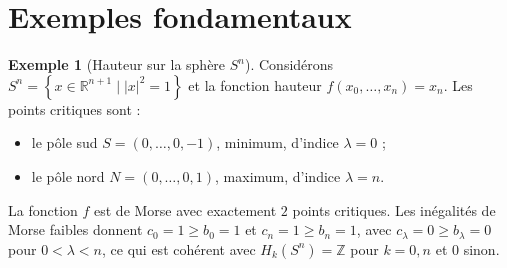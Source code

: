 \documentclass[12pt,a4paper,openany]{book}
\theoremstyle{definition}
\newtheorem{exemple}[definition]{Exemple}
\theoremstyle{plain}
\theoremstyle{remark}
\newcommand{\Z}{\mathbb{Z}}
\newcommand{\R}{\mathbb{R}}
\newcommand{\abs}[1]{\left|#1\right|}
\newcommand{\set}[1]{\left\{#1\right\}}
\begin{document}
\section{Exemples fondamentaux}\label{sec:morse-exemples}

\begin{exemple}[Hauteur sur la sphère $S^n$]\label{ex:morse-sphere}
Considérons $S^n = \set{x \in \R^{n+1} \mid \abs{x}^2 = 1}$ et la fonction
hauteur $f(x_0, \ldots, x_n) = x_n$. Les points critiques sont :
\begin{itemize}
  \item le pôle sud $S = (0, \ldots, 0, -1)$, minimum, d'indice $\lambda = 0$ ;
  \item le pôle nord $N = (0, \ldots, 0, 1)$, maximum, d'indice $\lambda = n$.
\end{itemize}
La fonction $f$ est de Morse avec exactement $2$ points critiques. Les
inégalités de Morse faibles donnent $c_0 = 1 \geqslant b_0 = 1$ et
$c_n = 1 \geqslant b_n = 1$, avec $c_\lambda = 0 \geqslant b_\lambda = 0$
pour $0 < \lambda < n$, ce qui est cohérent avec $H_k(S^n) = \Z$ pour $k = 0, n$
et $0$ sinon.
\end{exemple}
\end{document}
